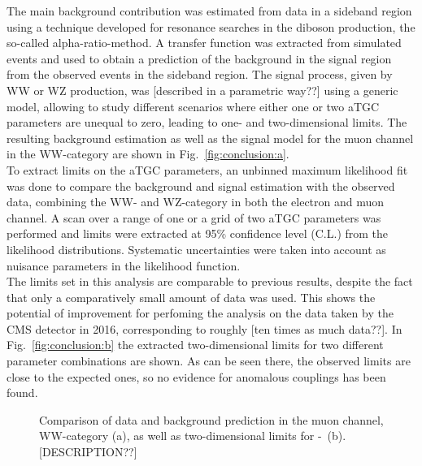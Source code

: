 The main background contribution was estimated from data in a sideband region using a technique developed for resonance searches in the diboson production, the so-called alpha-ratio-method. A transfer function was extracted from simulated events and used to obtain a prediction of the background in the signal region from the observed events in the sideband region. The signal process, given by WW or WZ production, was [described in a parametric way??] using a generic model, allowing to study different scenarios where either one or two aTGC parameters are unequal to zero, leading to one- and two-dimensional limits. The resulting background estimation as well as the signal model for the muon channel in the WW-category are shown in Fig.~\ref{fig:conclusion:a}.\\

To extract limits on the aTGC parameters, an unbinned maximum likelihood fit was done to compare the background and signal estimation with the observed data, combining the WW- and WZ-category in both the electron and muon channel. A scan over a range of one or a grid of two aTGC parameters was performed and limits were extracted at 95\% confidence level (C.L.) from the likelihood distributions. Systematic uncertainties were taken into account as nuisance parameters in the likelihood function.\\

The limits set in this analysis are comparable to previous results, despite the fact that only a comparatively small amount of data was used. This shows the potential of improvement for perfoming the analysis on the data taken by the CMS detector in 2016, corresponding to roughly [ten times as much data??]. In Fig.~\ref{fig:conclusion:b} the extracted two-dimensional limits for two different parameter combinations are shown. As can be seen there, the observed limits are close to the expected ones, so no evidence for anomalous couplings has been found.

\begin{figure}
    \centering
    \resizebox{\columnwidth}{!}
    {%
    \caption[Comparison of data and background prediction as well as two-dimensional limits for \Tccw -\Tcb]{Comparison of data and background prediction in the muon channel, WW-category (a), as well as two-dimensional limits for \Tccw -\Tcb \ (b). [DESCRIPTION??]}
    \label{fig:conclusion}
    }
\end{figure}